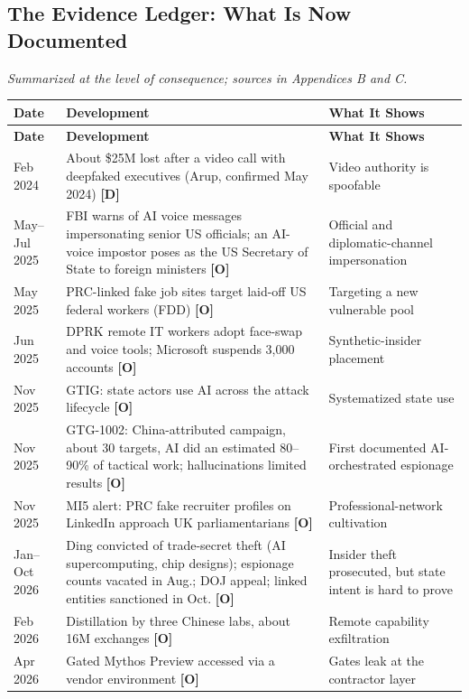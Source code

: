 \documentclass[11pt,letterpaper]{article}
\begin{document}
\subsection{The Evidence Ledger: What Is Now Documented}

\textit{Summarized at the level of consequence; sources in Appendices B and C.}

{\footnotesize
\begin{longtable}{L{1.7cm}L{7.4cm}L{3.9cm}}
\toprule
\textbf{Date} & \textbf{Development} & \textbf{What It Shows} \\
\midrule
\endfirsthead
\toprule
\textbf{Date} & \textbf{Development} & \textbf{What It Shows} \\
\midrule
\endhead
Feb 2024 & About \$25M lost after a video call with deepfaked executives (Arup, confirmed May 2024) \textbf{[D]} & Video authority is spoofable \\*
May--Jul 2025 & FBI warns of AI voice messages impersonating senior US officials; an AI-voice impostor poses as the US Secretary of State to foreign ministers \textbf{[O]} & Official and diplomatic-channel impersonation \\
May 2025 & PRC-linked fake job sites target laid-off US federal workers (FDD) \textbf{[O]} & Targeting a new vulnerable pool \\
Jun 2025 & DPRK remote IT workers adopt face-swap and voice tools; Microsoft suspends 3,000 accounts \textbf{[O]} & Synthetic-insider placement \\
Nov 2025 & GTIG: state actors use AI across the attack lifecycle \textbf{[O]} & Systematized state use \\
Nov 2025 & GTG-1002: China-attributed campaign, about 30 targets, AI did an estimated 80--90\% of tactical work; hallucinations limited results \textbf{[O]} & First documented AI-orchestrated espionage \\
Nov 2025 & MI5 alert: PRC fake recruiter profiles on LinkedIn approach UK parliamentarians \textbf{[O]} & Professional-network cultivation \\
Jan--Oct 2026 & Ding convicted of trade-secret theft (AI supercomputing, chip designs); espionage counts vacated in Aug.; DOJ appeal; linked entities sanctioned in Oct. \textbf{[O]} & Insider theft prosecuted, but state intent is hard to prove \\
Feb 2026 & Distillation by three Chinese labs, about 16M exchanges \textbf{[O]} & Remote capability exfiltration \\
Apr 2026 & Gated Mythos Preview accessed via a vendor environment \textbf{[O]} & Gates leak at the contractor layer \\

\end{longtable}}
\end{document}
